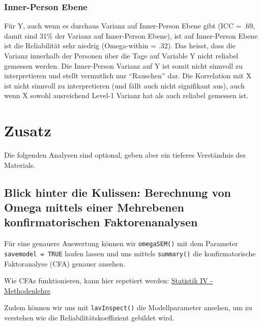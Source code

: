 \documentclass[
  letterpaper,
  DIV=11,
  numbers=noendperiod]{scrreprt}
\newenvironment{Shaded}{\begin{snugshade}}{\end{snugshade}}
\newcommand{\AttributeTok}[1]{\textcolor[rgb]{0.40,0.45,0.13}{#1}}
\newcommand{\ConstantTok}[1]{\textcolor[rgb]{0.56,0.35,0.01}{#1}}
\newcommand{\FunctionTok}[1]{\textcolor[rgb]{0.28,0.35,0.67}{#1}}
\newcommand{\NormalTok}[1]{\textcolor[rgb]{0.00,0.23,0.31}{#1}}
\newcommand{\OtherTok}[1]{\textcolor[rgb]{0.00,0.23,0.31}{#1}}
\newcommand{\SpecialCharTok}[1]{\textcolor[rgb]{0.37,0.37,0.37}{#1}}
\newcommand{\StringTok}[1]{\textcolor[rgb]{0.13,0.47,0.30}{#1}}
\begin{document}
\begin{tcolorbox}
\subsubsection{Inner-Person Ebene}\label{inner-person-ebene}

Für Y, auch wenn es durchaus Varianz auf Inner-Person Ebene gibt (ICC =
.69, damit sind 31\% der Varianz auf Inner-Person Ebene), ist auf
Inner-Person Ebene ist die Reliabilität sehr niedrig (Omega-within =
.32). Das heisst, dass die Varianz innerhalb der Personen über die Tage
auf Variable Y nicht reliabel gemessen werden. Die Inner-Person Varianz
auf Y ist somit nicht sinnvoll zu interpretieren und stellt vermutlich
nur ``Rauschen'' dar. Die Korrelation mit X ist nicht sinnvoll zu
interpretieren (und fällt auch nicht signifikant aus), auch wenn X
sowohl ausreichend Level-1 Varianz hat als auch reliabel gemessen ist.

\end{tcolorbox}

\section{Zusatz}\label{zusatz}

Die folgenden Analysen sind optional, geben aber ein tieferes
Verständnis des Materials.

\subsection{Blick hinter die Kulissen: Berechnung von Omega mittels
einer Mehrebenen konfirmatorischen
Faktorenanalysen}\label{blick-hinter-die-kulissen-berechnung-von-omega-mittels-einer-mehrebenen-konfirmatorischen-faktorenanalysen}

Für eine genauere Auswertung können wir \texttt{omegaSEM()} mit dem
Parameter \texttt{savemodel\ =\ TRUE} laufen lassen und uns mittels
\texttt{summary()} die konfirmatorische Faktoranalyse (CFA) genauer
ansehen.

Wie CFAs funktionieren, kann hier repetiert werden:
\href{https://methodenlehre.github.io/statistik-IV/chapters/CFA.html}{Statistik
IV - Methodenlehre}

Zudem können wir uns mit \texttt{lavInspect()} die Modellparameter
ansehen, um zu verstehen wie die Reliabilitätskoeffizient gebildet wird.

\begin{Shaded}
\end{Shaded}
\end{document}
